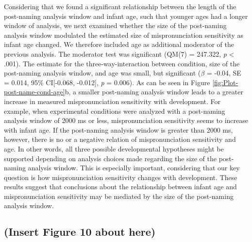 \documentclass[man]{apa6}
\theoremstyle{definition}
\theoremstyle{definition}
\theoremstyle{definition}
\theoremstyle{remark}
\begin{document}
Considering that we found a significant relationship between the length
of the post-naming analysis window and infant age, such that younger
ages had a longer window of analysis, we next examined whether the size
of the post-naming analysis window modulated the estimated size of
mispronunciation sensitivity as infant age changed. We therefore
included age as additional moderator of the previous analysis. The
moderator test was significant (QM(7) = 247.322, \emph{p} \textless{}
.001). The estimate for the three-way-interaction between condition,
size of the post-naming analysis window, and age was small, but
significant (\(\beta\) = -0.04, SE = 0.014, 95\% CI{[}-0.068, -0.012{]},
\emph{p} = 0.006). As can be seen in Figure
\ref{fig:Plot-post-name-cond-age}b, a smaller post-naming analysis
window leads to a greater increase in measured mispronunciation
sensitivity with development. For example, when experimental conditions
were analyzed with a post-naming analysis window of 2000 ms or less,
mispronunciation sensitivity seems to increase with infant age. If the
post-naming analysis window is greater than 2000 ms, however, there is
no or a negative relation of mispronunciation sensitivity and age. In
other words, all three possible developmental hypotheses might be
supported depending on analysis choices made regarding the size of the
post-naming analysis window. This is especially important, considering
that our key question is how mispronunciation sensitivity changes with
development. These results suggest that conclusions about the
relationship between infant age and mispronunciation sensitivity may be
mediated by the size of the post-naming analysis window.

\subsection{(Insert Figure 10 about
here)}\label{insert-figure-10-about-here}
\end{document}
